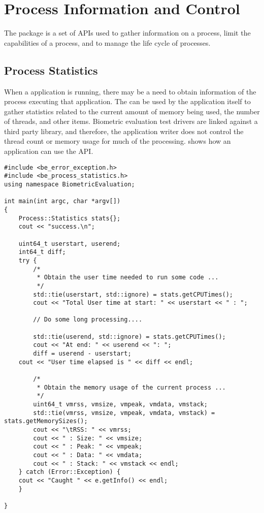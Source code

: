 %
%
\chapter{Process Information and Control}
\label{chp-process}

The  package is a set of APIs used to gather information on
a process, limit the capabilities of a process, and to manage the life cycle
of processes.

\section{Process Statistics}
\label{sec-process_statistics}

When a application is running, there may be a need to obtain information of the
process executing that application. The  can be used
by the application itself to gather statistics related to the current amount
of memory
being used, the number of threads, and other items. Biometric evaluation test
drivers are linked against a third party library, and therefore, the application
writer does not control the thread count or memory usage for much of the
processing.  shows how an application can
use the  API.

\begin{lstlisting}[caption={Gathering Process Statistics}, label=lst:processstatisticsuse]
#include <be_error_exception.h>
#include <be_process_statistics.h>
using namespace BiometricEvaluation;

int main(int argc, char *argv[])
{
    Process::Statistics stats{};
    cout << "success.\n";

    uint64_t userstart, userend;
    int64_t diff;
    try {
        /*
         * Obtain the user time needed to run some code ...
         */
        std::tie(userstart, std::ignore) = stats.getCPUTimes();
        cout << "Total User time at start: " << userstart << " : ";

        // Do some long processing....

        std::tie(userend, std::ignore) = stats.getCPUTimes();
        cout << "At end: " << userend << ": ";
        diff = userend - userstart;
	cout << "User time elapsed is " << diff << endl;

        /*
         * Obtain the memory usage of the current process ...
         */
        uint64_t vmrss, vmsize, vmpeak, vmdata, vmstack;
        std::tie(vmrss, vmsize, vmpeak, vmdata, vmstack) = stats.getMemorySizes();
        cout << "\tRSS: " << vmrss;
        cout << " : Size: " << vmsize;
        cout << " : Peak: " << vmpeak;
        cout << " : Data: " << vmdata;
        cout << " : Stack: " << vmstack << endl;
    } catch (Error::Exception) {
	cout << "Caught " << e.getInfo() << endl;
    }

}
\end{lstlisting}

